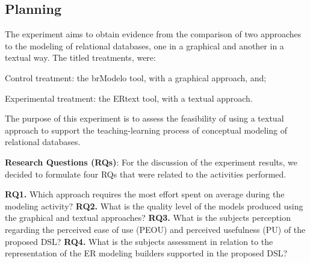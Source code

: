 \documentclass[a4paper,twoside,anonymous]{article}
\begin{document}
\subsection{Planning}

The experiment aims to obtain evidence from the comparison of two approaches to the modeling of relational databases, one in a graphical and another in a textual way.
The titled treatments, were:
\begin{inparaenum}[(i)]
\item Control treatment: the brModelo tool, with a graphical approach, and;
\item Experimental treatment: the ERtext tool, with a textual approach.
\end{inparaenum}
The purpose of this experiment is to assess the feasibility of using a textual approach to support the teaching-learning process of conceptual modeling of relational databases.


\textbf{Research Questions (RQs)}: For the discussion of the experiment results, we decided to formulate four RQs that were related to the activities performed.

    \textbf{RQ1.} Which approach requires the most effort spent on average during the modeling activity?
    \textbf{RQ2.} What is the quality level of the models produced using the graphical and textual approaches?
    \textbf{RQ3.} What is the subjects perception regarding the perceived ease of use (PEOU) and perceived usefulness (PU) of the proposed DSL?
    \textbf{RQ4.} What is the subjects assessment in relation to the representation of the ER modeling builders supported in the proposed DSL?

\end{document}
